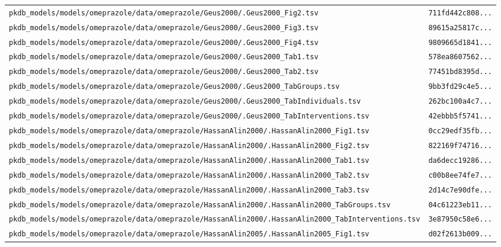 \documentclass{article}
\begin{document}
\begin{longtable}{ll}
\texttt{pkdb\_models/models/omeprazole/data/omeprazole/Geus2000/.Geus2000\_Fig2.tsv} & \texttt{711fd442c808...} \\
\texttt{pkdb\_models/models/omeprazole/data/omeprazole/Geus2000/.Geus2000\_Fig3.tsv} & \texttt{89615a25817c...} \\
\texttt{pkdb\_models/models/omeprazole/data/omeprazole/Geus2000/.Geus2000\_Fig4.tsv} & \texttt{9809665d1841...} \\
\texttt{pkdb\_models/models/omeprazole/data/omeprazole/Geus2000/.Geus2000\_Tab1.tsv} & \texttt{578ea8607562...} \\
\texttt{pkdb\_models/models/omeprazole/data/omeprazole/Geus2000/.Geus2000\_Tab2.tsv} & \texttt{77451bd8395d...} \\
\texttt{pkdb\_models/models/omeprazole/data/omeprazole/Geus2000/.Geus2000\_TabGroups.tsv} & \texttt{9bb3fd29c4e5...} \\
\texttt{pkdb\_models/models/omeprazole/data/omeprazole/Geus2000/.Geus2000\_TabIndividuals.tsv} & \texttt{262bc100a4c7...} \\
\texttt{pkdb\_models/models/omeprazole/data/omeprazole/Geus2000/.Geus2000\_TabInterventions.tsv} & \texttt{42ebbb5f5741...} \\
\texttt{pkdb\_models/models/omeprazole/data/omeprazole/HassanAlin2000/.HassanAlin2000\_Fig1.tsv} & \texttt{0cc29edf35fb...} \\
\texttt{pkdb\_models/models/omeprazole/data/omeprazole/HassanAlin2000/.HassanAlin2000\_Fig2.tsv} & \texttt{822169f74716...} \\
\texttt{pkdb\_models/models/omeprazole/data/omeprazole/HassanAlin2000/.HassanAlin2000\_Tab1.tsv} & \texttt{da6decc19286...} \\
\texttt{pkdb\_models/models/omeprazole/data/omeprazole/HassanAlin2000/.HassanAlin2000\_Tab2.tsv} & \texttt{c00b8ee74fe7...} \\
\texttt{pkdb\_models/models/omeprazole/data/omeprazole/HassanAlin2000/.HassanAlin2000\_Tab3.tsv} & \texttt{2d14c7e90dfe...} \\
\texttt{pkdb\_models/models/omeprazole/data/omeprazole/HassanAlin2000/.HassanAlin2000\_TabGroups.tsv} & \texttt{04c61223eb11...} \\
\texttt{pkdb\_models/models/omeprazole/data/omeprazole/HassanAlin2000/.HassanAlin2000\_TabInterventions.tsv} & \texttt{3e87950c58e6...} \\
\texttt{pkdb\_models/models/omeprazole/data/omeprazole/HassanAlin2005/.HassanAlin2005\_Fig1.tsv} & \texttt{d02f2613b009...} \\

\end{longtable}
\end{document}
